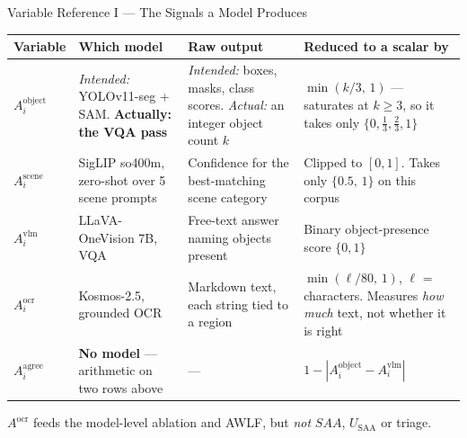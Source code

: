 \documentclass[aspectratio=169,11pt]{beamer}
\begin{document}
\begin{frame}{Variable Reference I --- The Signals a Model Produces}
\tiny
\begin{center}
\renewcommand{\arraystretch}{0.92}
\begin{tabular}{@{}p{1.6cm} p{2.7cm} p{3.5cm} p{4.2cm}@{}}
\toprule
\textbf{Variable} & \textbf{Which model} & \textbf{Raw output} & \textbf{Reduced to a scalar by} \\
\midrule
$A^{\text{object}}_i$ &
\emph{Intended:} YOLOv11-seg + SAM. \textbf{Actually: the VQA pass} &
\emph{Intended:} boxes, masks, class scores. \emph{Actual:} an integer object count $k$ &
$\min(k/3,\,1)$ --- saturates at $k\!\ge\!3$, so it takes only $\{0,\tfrac13,\tfrac23,1\}$ \\
\addlinespace
$A^{\text{scene}}_i$ &
SigLIP so400m, zero-shot over 5 scene prompts &
Confidence for the best-matching scene category &
Clipped to $[0,1]$. Takes only $\{0.5,\,1\}$ on this corpus \\
\addlinespace
$A^{\text{vlm}}_i$ &
LLaVA-OneVision 7B, VQA &
Free-text answer naming objects present &
Binary object-presence score $\{0,1\}$ \\
\addlinespace
$A^{\text{ocr}}_i$ &
Kosmos-2.5, grounded OCR &
Markdown text, each string tied to a region &
$\min(\ell/80,\,1)$, $\ell$ = characters. Measures \emph{how much} text, not whether it is right \\
\addlinespace
$A^{\text{agree}}_i$ &
\textbf{No model} --- arithmetic on two rows above &
--- &
$1-\left|A^{\text{object}}_i - A^{\text{vlm}}_i\right|$ \\
\bottomrule
\end{tabular}
\end{center}
\vspace{-1mm}
\scriptsize $A^{\text{ocr}}$ feeds the model-level ablation and AWLF, but \emph{not} $SAA$, $U_{\text{SAA}}$ or triage.
\end{frame}
\end{document}
